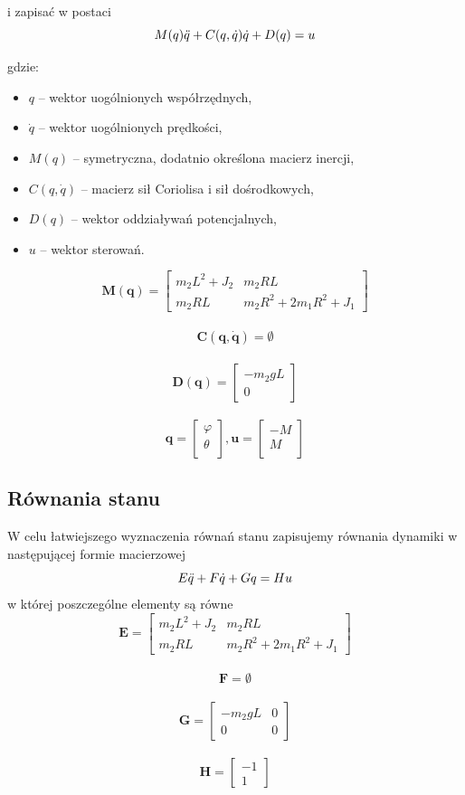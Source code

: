 i zapisać w postaci 
$$
M(q)\Ddot{q} + C(q,\dot{q})\dot{q} + D(q) = u 
$$

gdzie:
\begin{itemize}
    \item $q$ -- wektor uogólnionych współrzędnych,
    \item $\dot{q}$ -- wektor uogólnionych prędkości,
    \item $M(q)$ -- symetryczna, dodatnio określona macierz inercji,
    \item $C(q,\dot{q})$ -- macierz sił Coriolisa i sił dośrodkowych,
    \item $D(q)$ -- wektor oddziaływań potencjalnych,
    \item $u$ -- wektor sterowań.
\end{itemize}

$$
\mathbf{M(q)} =
\left[ \begin{array}{cc}
m_2L^2 + J_2 & m_2RL \\
m_2RL & m_2R^2 + 2m_1R^2 + J_1
\end{array} \right]
$$
\\
$$
\mathbf{C(q,\dot{q})} = \emptyset
$$
\\
$$
\mathbf{D(q)} =
\left[ \begin{array}{c}
-m_2gL \\
0
\end{array} \right]
$$
\\
$$
\mathbf{q} =
\left[ \begin{array}{c}
\varphi \\
\theta \\
\end{array} \right]
,
\mathbf{u} =
\left[ \begin{array}{c}
-M \\
M \\
\end{array} \right]
$$

\subsection{Równania stanu}

W celu łatwiejszego wyznaczenia równań stanu zapisujemy równania dynamiki w następującej formie macierzowej  
$$
E\Ddot{q} + F\dot{q} + Gq = Hu 
$$
w której poszczególne elementy są równe
$$
\mathbf{E} = 
\left[ \begin{array}{cc}
m_2L^2 + J_2 & m_2RL \\
m_2RL & m_2R^2 + 2m_1R^2 + J_1
\end{array} \right]
$$
\\
$$
\mathbf{F} = \emptyset
$$
\\
$$
\mathbf{G} = 
\left[ \begin{array}{cc}
-m_2gL & 0 \\
0 & 0
\end{array} \right]
$$
\\
$$
\mathbf{H} = 
\left[ \begin{array}{c}
-1 \\
1
\end{array} \right]
$$

